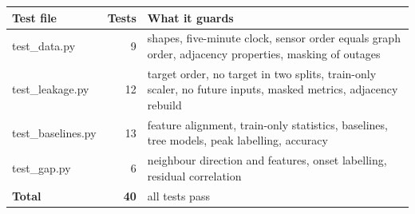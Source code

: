 \begin{tabularx}{\textwidth}{@{}lrX@{}}
\toprule
Test file & Tests & What it guards \\
\midrule
test\_data.py & 9 & shapes, five-minute clock, sensor order equals graph order, adjacency properties, masking of outages \\
test\_leakage.py & 12 & target order, no target in two splits, train-only scaler, no future inputs, masked metrics, adjacency rebuild \\
test\_baselines.py & 13 & feature alignment, train-only statistics, baselines, tree models, peak labelling, accuracy \\
test\_gap.py & 6 & neighbour direction and features, onset labelling, residual correlation \\
\textbf{Total} & \textbf{40} & all tests pass \\
\bottomrule
\end{tabularx}

